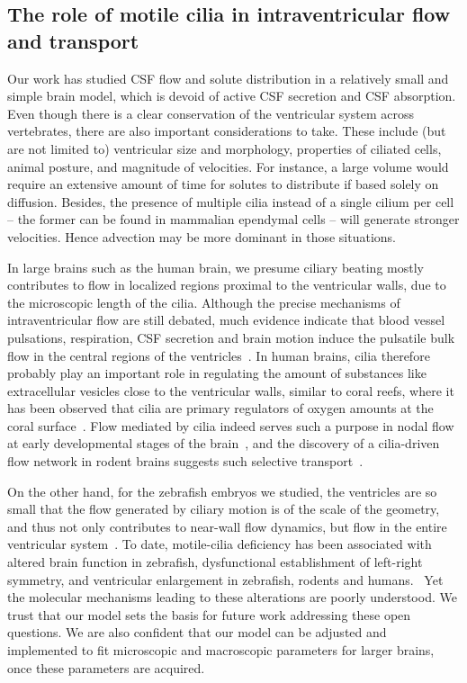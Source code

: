 \documentclass{WileyMSP-template}
\begin{document}
\subsection{The role of motile cilia in intraventricular flow and transport}
Our work has studied CSF flow and solute distribution
in a relatively small and simple brain model, which is devoid of
active CSF secretion and CSF absorption. Even though there is
a clear conservation of the ventricular system across vertebrates,
there are also important considerations to take. These include (but are not limited to)
ventricular size and morphology, properties of ciliated cells,
animal posture, and magnitude of velocities. For instance, a large
volume would require an extensive amount of time for solutes to distribute
if based solely on diffusion. Besides, the presence of multiple cilia
instead of a single cilium per cell -- the former can be found in
mammalian ependymal cells -- will generate stronger velocities.
Hence advection may be more dominant in those situations.

In large brains such as the human brain, we presume ciliary beating mostly 
contributes to flow in localized regions proximal to the ventricular walls, due to
the microscopic length of the cilia.
Although the precise mechanisms of intraventricular flow are still debated,
much evidence indicate that blood vessel pulsations, respiration, CSF secretion
and brain motion induce the pulsatile bulk flow in the central
regions of the ventricles~\cite{Vinje2019RespiratoryMeasurements,
Siyahhan2014FlowVentricles, Linninger2005PulsatileBrain, Enzmann1992BrainImaging,
Kurtcuoglu2007ComputationalSylvius}.
In human brains, cilia therefore probably play an important role in regulating the
amount of substances like extracellular vesicles close to the ventricular walls, similar to coral
reefs, where it has been observed that cilia are primary regulators of
oxygen amounts at the coral surface~\cite{Pacherres2022CiliaryProduction}.
Flow mediated by cilia indeed serves such a purpose in nodal flow at early
developmental stages of the brain~\cite{Hirokawa2006NodalAsymmetry}, and the discovery
of a cilia-driven flow network in rodent brains suggests such selective
transport~\cite{Faubel2016Cilia-basedVentricles}.

On the other hand, for the zebrafish embryos we studied,
the ventricles are so small that the flow
generated by ciliary motion is of the scale of the geometry, and thus not
only contributes to near-wall flow dynamics, but flow in the entire ventricular
system~\cite{Olstad2019CiliaryDevelopment}.
To date, motile-cilia deficiency has been associated with altered brain function
in zebrafish, dysfunctional establishment of left-right symmetry,
and ventricular enlargement in zebrafish, rodents and humans.~\cite{Afzelius2004CiliaRelatedDiseases,
Youn2018PrimaryDiseases, Ma2024CiliaDisease, Ibanez-Tallon2002LossHydrocephalus}
Yet the molecular mechanisms leading to these alterations are poorly understood.
We trust that our model sets the basis for future work addressing these open questions.
We are also confident that our model can be adjusted and implemented to fit
microscopic and macroscopic parameters for larger brains, once these parameters are acquired.
\end{document}
